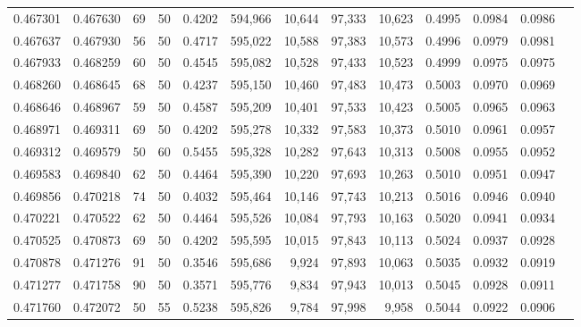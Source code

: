 \begin{tabular}{rrrrrrrrrrrrr}
0.467301 & 0.467630 &    69 &  50 &                                     0.4202 & 594,966 &  10,644 &  97,333 &  10,623 & 0.4995 & 0.0984 & 0.0986 \\
0.467637 & 0.467930 &    56 &  50 &                                     0.4717 & 595,022 &  10,588 &  97,383 &  10,573 & 0.4996 & 0.0979 & 0.0981 \\
0.467933 & 0.468259 &    60 &  50 &                                     0.4545 & 595,082 &  10,528 &  97,433 &  10,523 & 0.4999 & 0.0975 & 0.0975 \\
0.468260 & 0.468645 &    68 &  50 &                                     0.4237 & 595,150 &  10,460 &  97,483 &  10,473 & 0.5003 & 0.0970 & 0.0969 \\
0.468646 & 0.468967 &    59 &  50 &                                     0.4587 & 595,209 &  10,401 &  97,533 &  10,423 & 0.5005 & 0.0965 & 0.0963 \\
0.468971 & 0.469311 &    69 &  50 &                                     0.4202 & 595,278 &  10,332 &  97,583 &  10,373 & 0.5010 & 0.0961 & 0.0957 \\
0.469312 & 0.469579 &    50 &  60 &                                     0.5455 & 595,328 &  10,282 &  97,643 &  10,313 & 0.5008 & 0.0955 & 0.0952 \\
0.469583 & 0.469840 &    62 &  50 &                                     0.4464 & 595,390 &  10,220 &  97,693 &  10,263 & 0.5010 & 0.0951 & 0.0947 \\
0.469856 & 0.470218 &    74 &  50 &                                     0.4032 & 595,464 &  10,146 &  97,743 &  10,213 & 0.5016 & 0.0946 & 0.0940 \\
0.470221 & 0.470522 &    62 &  50 &                                     0.4464 & 595,526 &  10,084 &  97,793 &  10,163 & 0.5020 & 0.0941 & 0.0934 \\
0.470525 & 0.470873 &    69 &  50 &                                     0.4202 & 595,595 &  10,015 &  97,843 &  10,113 & 0.5024 & 0.0937 & 0.0928 \\
0.470878 & 0.471276 &    91 &  50 &                                     0.3546 & 595,686 &   9,924 &  97,893 &  10,063 & 0.5035 & 0.0932 & 0.0919 \\
0.471277 & 0.471758 &    90 &  50 &                                     0.3571 & 595,776 &   9,834 &  97,943 &  10,013 & 0.5045 & 0.0928 & 0.0911 \\
0.471760 & 0.472072 &    50 &  55 &                                     0.5238 & 595,826 &   9,784 &  97,998 &   9,958 & 0.5044 & 0.0922 & 0.0906 \\

\end{tabular}
